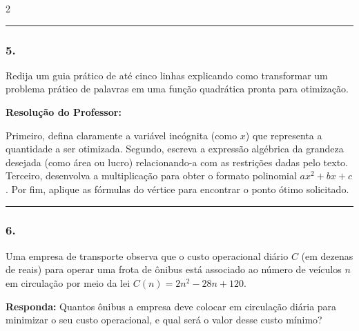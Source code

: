 \begin{multicols*}{2}
\par\vspace{\espacoQuestao}

\noindent\textcolor{CorLinha}{\rule{\linewidth}{0.5pt}} 
\par\vspace{\espacoPreQuestao}
\subsubsection*{5.} Redija um guia prático de até cinco linhas explicando como transformar um problema prático de palavras em uma função quadrática pronta para otimização.

\ifgabarito
    \begin{tcolorbox}[colback=CorTitUm!5, colframe=CorTitUm, boxrule=1pt, arc=4pt, left=6pt, right=6pt, top=6pt, bottom=6pt]
    \small\textbf{\textcolor{CorTitUm}{Resolução do Professor:}}\par\vspace{0.1cm}
    \color{CinzaEscuro}
    Primeiro, defina claramente a variável incógnita (como $x$) que representa a quantidade a ser otimizada. Segundo, escreva a expressão algébrica da grandeza desejada (como área ou lucro) relacionando-a com as restrições dadas pelo texto. Terceiro, desenvolva a multiplicação para obter o formato polinomial $ax^2 + bx + c$. Por fim, aplique as fórmulas do vértice para encontrar o ponto ótimo solicitado.
    \end{tcolorbox}
\fi

\par\vspace{\espacoQuestao}

\noindent\textcolor{CorLinha}{\rule{\linewidth}{0.5pt}} 
\par\vspace{\espacoPreQuestao}
\subsubsection*{6.} Uma empresa de transporte observa que o custo operacional diário $C$ (em dezenas de reais) para operar uma frota de ônibus está associado ao número de veículos $n$ em circulação por meio da lei $C(n) = 2n^2 - 28n + 120$.

\begin{boxresponda}
\textbf{Responda:} Quantos ônibus a empresa deve colocar em circulação diária para minimizar o seu custo operacional, e qual será o valor desse custo mínimo?
\end{boxresponda}


\end{multicols*}
